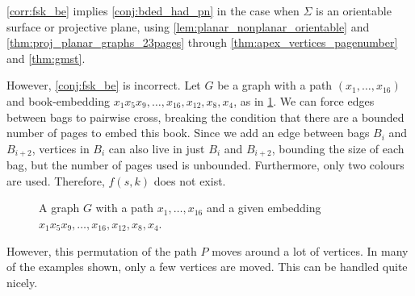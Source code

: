 \cref{corr:fsk_be} implies \cref{conj:bded_had_pn} in the case when $\Sigma$ is an orientable surface or projective plane, using \cref{lem:planar_nonplanar_orientable} and \cref{thm:proj_planar_graphs_23pages} through \cref{thm:apex_vertices_pagenumber} and \cref{thm:gmst}. 

However, \cref{conj:fsk_be} is incorrect. Let $G$ be a graph with a path $(x_1, \ldots, x_{16})$ and book-embedding $x_1 x_5 x_9, \ldots, x_{16}, x_{12}, x_{8}, x_{4}$, as in \cref{fig:counterexample_2}. We can force edges between bags to pairwise cross, breaking the condition that there are a bounded number of pages to embed this book. Since we add an edge between bags $B_i$ and $B_{i + 2}$, vertices in $B_i$ can also live in just $B_i$ and $B_{i + 2}$, bounding the size of each bag, but the number of pages used is unbounded. Furthermore, only two colours are used. Therefore, $f(s, k)$ does not exist.

\begin{figure}[h!]
	\centering
	
	\caption[Counterexample to bounded number of colours]{A graph $G$ with a path $x_1, \ldots, x_{16}$ and a given embedding $x_1 x_5 x_9, \ldots, x_{16}, x_{12}, x_{8}, x_{4}$. }\label{fig:counterexample_2}
\end{figure}

However, this permutation of the path $P$ moves around a lot of vertices. In many of the examples shown, only a few vertices are moved. This can be handled quite nicely. 